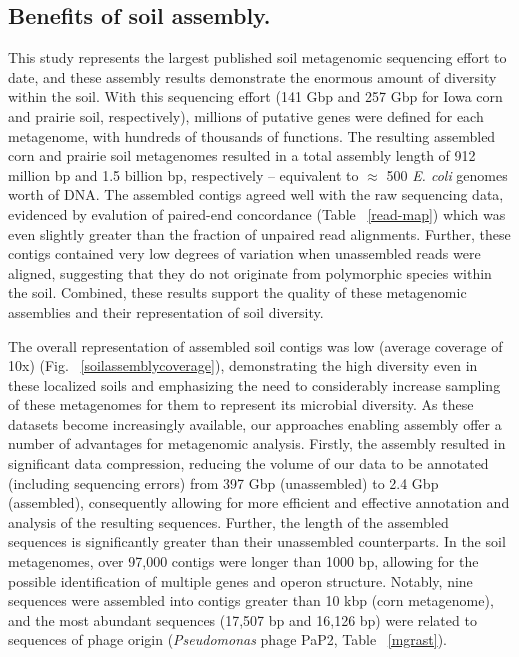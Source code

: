 \documentclass{pnastwo}
\begin{document}
\begin{article}
\subsection*{Benefits of soil assembly.} 
This study represents the largest
published soil metagenomic sequencing effort to date, and these assembly results
demonstrate the enormous amount of diversity within the soil.  With this sequencing effort (141 Gbp and 257 Gbp for Iowa corn and prairie soil, respectively), millions of putative genes were defined for each metagenome, with hundreds of thousands of functions. The resulting assembled
corn and prairie soil metagenomes resulted in a total assembly length of 912
million bp and 1.5 billion bp, respectively -- equivalent to $\approx$ 500
\emph{E. coli} genomes worth of DNA. The assembled contigs agreed well with the
raw sequencing data, evidenced by evalution of paired-end concordance (Table
~\ref{read-map}) which was even slightly greater than the fraction of unpaired read alignments.  Further, these contigs contained very low degrees of variation when unassembled reads were aligned, suggesting that they do not originate from polymorphic species within the soil.  Combined, these results support the quality of these metagenomic assemblies and their representation of soil diversity.   

The overall representation of assembled soil contigs was low (average coverage of 10x) (Fig. ~\ref{soilassemblycoverage}), demonstrating the high diversity even in these localized soils and emphasizing the need to considerably increase sampling of these metagenomes for them to represent its microbial diversity.  As these datasets become increasingly available, our approaches enabling assembly offer a number of advantages for metagenomic
analysis. Firstly, the assembly resulted in significant data compression,
reducing the volume of our data to be annotated (including sequencing errors) from 397 Gbp (unassembled)
to 2.4 Gbp (assembled), consequently allowing for more efficient and effective annotation
and analysis of the resulting sequences. Further, the length of the assembled sequences
is significantly greater than their unassembled counterparts.  In the soil metagenomes, over 97,000 contigs were longer than 1000 
bp, allowing for the possible identification of multiple genes and operon structure.
Notably, nine sequences were assembled into contigs greater than 10 kbp (corn
metagenome), and the most abundant sequences (17,507 bp and 16,126 bp) were
related to sequences of phage origin ({\em Pseudomonas} phage PaP2, Table ~\ref{mgrast}).


\end{article}
\end{document}
